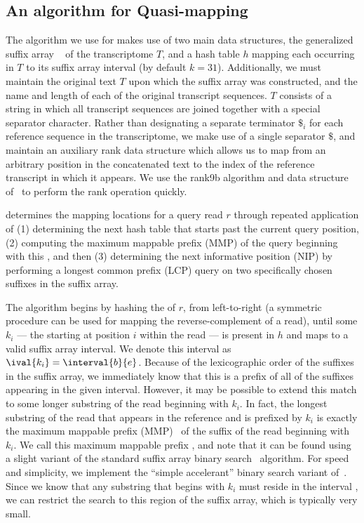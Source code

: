 \subsection{An algorithm for Quasi-mapping} \label{sec:overview} 
The algorithm we use for \qm makes use of two main data structures, the generalized suffix array
~\citep{Manber:1993:Suffix}  of the transcriptome $T$, and a hash table $h$ mapping each \kmer occurring in $T$ to its suffix array interval (by default $k = 31$).  Additionally, we must maintain the original text $T$ upon which the suffix array was constructed, and the name and length of each of the original transcript sequences.  $T$ consists of a string in which all transcript sequences are joined together with a special separator character.  Rather than designating a separate terminator $\$_{i}$ for each reference sequence in the transcriptome, we make use of a single separator $\$$, and maintain an auxiliary rank data structure which allows us to map from an arbitrary position in the concatenated text to the index of the reference transcript in which it appears.  We use the rank9b algorithm and data structure of~\citet{Vigna:2008:Broadword} to perform the rank operation quickly.

\Qm determines the mapping locations for a query read $r$ through repeated application of (1) determining the next hash table \kmer that starts past the current query position, (2) computing the maximum mappable prefix (MMP) of the query beginning with this \kmer, and then (3) determining the next informative position (NIP) by performing a longest common prefix (LCP) query on two specifically chosen suffixes in the suffix array.

The algorithm begins by hashing the \kmers of $r$, from left-to-right (a symmetric procedure can be used for mapping the reverse-complement of a read), until some \kmer $k_i$ --- the \kmer starting at position $i$ within the read --- is present in $h$ and maps to a valid suffix array interval. We denote this interval as $\ival{k_i} = \interval{b}{e}$. Because of the lexicographic order of the suffixes in the suffix array, we immediately know that this \kmer is a prefix of all of the suffixes appearing in the given interval.  However, it may be possible to extend this match to some longer substring of the read beginning with $k_i$. In fact, the longest substring of the read that appears in the reference and is prefixed by $k_i$ is exactly the maximum mappable prefix (MMP)~\citep{star} of the suffix of the read beginning with $k_i$.  We call this maximum mappable prefix \MMP[i], and note that it can be found using a slight variant of the standard suffix array binary search~\citep{Manber:1993:Suffix} algorithm.  For speed and simplicity, we implement the ``simple accelerant'' binary search variant of~\citet{Gusfield}.  Since we know that any substring that begins with $k_i$ must reside in the interval , we can restrict the \MMP[i] search to this region of the suffix array, which is typically very small.

